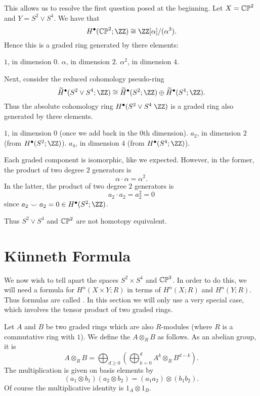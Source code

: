 This allows us to resolve the first question posed at the beginning.
Let $X = \mathbb{CP}^2$ and $Y = S^2 \vee S^4$.
We have that
\[ H^\bullet(\CP^2; \ZZ) \cong \ZZ[\alpha] / (\alpha^3). \]
Hence this is a graded ring generated by there elements:
\begin{itemize}
	\ii $1$, in dimension $0$.
	\ii $\alpha$, in dimension $2$.
	\ii $\alpha^2$, in dimension $4$.
\end{itemize}
Next, consider the reduced cohomology pseudo-ring
\[ \wt H^\bullet(S^2 \vee S^4; \ZZ) \cong
	\wt H^\bullet(S^2; \ZZ)
	\oplus \wt H^\bullet(S^4 ; \ZZ).
\]
Thus the absolute cohomology ring $H^\bullet(S^2 \vee S^4 \; \ZZ)$
is a graded ring also generated by three elements.
\begin{itemize}
	\ii $1$, in dimension $0$ (once we add back in the $0$th dimension).
	\ii $a_2$, in dimension $2$ (from $H^\bullet(S^2 ; \ZZ)$).
	\ii $a_4$, in dimension $4$ (from $H^\bullet(S^4 ; \ZZ)$).
\end{itemize}
Each graded component is isomorphic, like we expected.
However, in the former, the product of two degree $2$ generators is
\[ \alpha \cdot \alpha = \alpha^2. \]
In the latter, the product of two degree $2$ generators is
\[ a_2 \cdot a_2 = a_2^2 = 0 \]
since $a_2 \smile a_2 = 0 \in H^\bullet(S^2; \ZZ)$.

Thus $S^2 \vee S^4$ and $\mathbb{CP}^2$ are not homotopy equivalent.

\section{K\"unneth Formula}
We now wish to tell apart the spaces $S^2 \times S^4$ and $\mathbb{CP}^3$.
In order to do this, we will need a formula
for $H^n(X \times Y; R)$ in terms of $H^n(X;R)$ and $H^n(Y;R)$.
Thus formulas are called .
In this section we will only use a very special case,
which involves the tensor product of two graded rings.

\begin{definition}
	Let $A$ and $B$ be two graded rings which are also $R$-modules
	(where $R$ is a commutative ring with $1$).
	We define the  $A \otimes_R B$ as follows.
	As an abelian group, it is 
	\[ A \otimes_R B = \bigoplus_{d \ge 0}
		\left( \bigoplus_{k=0}^{d} A^k \otimes_R B^{d-k}  \right). \]
	The multiplication is given on basis elements by
	\[ \left( a_1 \otimes b_1 \right)\left( a_2 \otimes b_2 \right)
		= (a_1a_2) \otimes (b_1b_2).
	\]
	Of course the multiplicative identity is $1_A \otimes 1_B$.
\end{definition}

